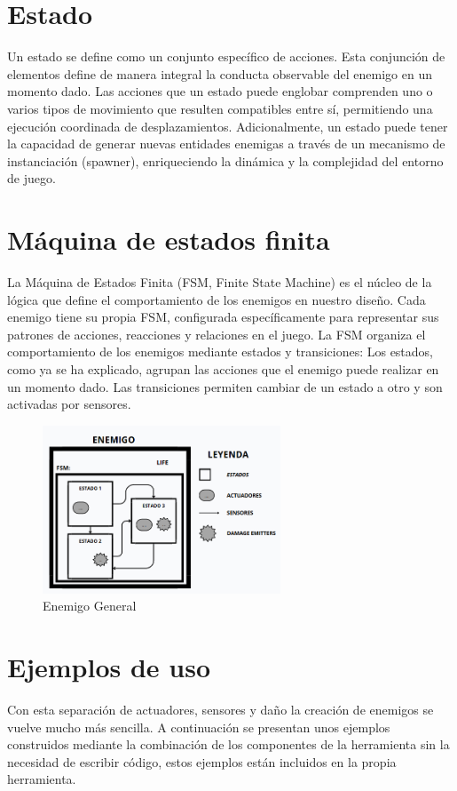 \section{Estado}
\label{subsec:estado}

Un estado se define como un conjunto específico de acciones. Esta conjunción de elementos define de manera integral la conducta observable del enemigo en un momento dado. Las acciones que un estado puede englobar comprenden uno o varios tipos de movimiento que resulten compatibles entre sí, permitiendo una ejecución coordinada de desplazamientos. Adicionalmente, un estado puede tener la capacidad de generar nuevas entidades enemigas a través de un mecanismo de instanciación (spawner), enriqueciendo la dinámica y la complejidad del entorno de juego. 

\section{Máquina de estados finita}

La Máquina de Estados Finita (FSM, Finite State Machine) es el núcleo de la lógica que define el comportamiento de los enemigos en nuestro diseño. Cada enemigo tiene su propia FSM, configurada específicamente para representar sus patrones de acciones, reacciones y relaciones en el juego. La FSM organiza el comportamiento de los enemigos mediante estados y transiciones:
Los estados, como ya se ha explicado, agrupan las acciones que el enemigo puede realizar en un momento dado.
Las transiciones permiten cambiar de un estado a otro y son activadas por sensores.\\

\begin{figure}[t]
	\centering
	\includegraphics[height=5cm]{Imagenes/EnemigoGeneral.png}
	\caption{Enemigo General }
	\label{fig:EnemigoGeneral}
\end{figure}

\section{Ejemplos de uso}
Con esta separación de actuadores, sensores y daño la creación de enemigos se vuelve mucho más sencilla. A continuación se presentan unos ejemplos construidos mediante la combinación de los componentes de la herramienta sin la necesidad de escribir código, estos ejemplos están incluidos en la propia herramienta.\\


